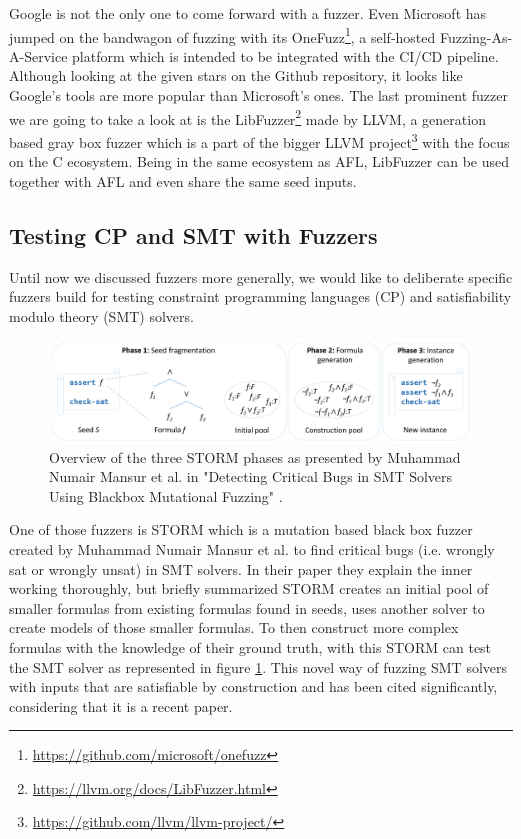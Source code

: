 Google is not the only one to come forward with a fuzzer. Even Microsoft has jumped on the bandwagon of fuzzing with its OneFuzz\footnote{\url{https://github.com/microsoft/onefuzz}}, a self-hosted Fuzzing-As-A-Service platform which is intended to be integrated with the CI/CD pipeline. Although looking at the given stars on the Github repository, it looks like Google's tools are more popular than Microsoft's ones. The last prominent fuzzer we are going to take a look at is the LibFuzzer\footnote{\url{https://llvm.org/docs/LibFuzzer.html}} made by LLVM, a generation based gray box fuzzer which is a part of the bigger LLVM project\footnote{\url{https://github.com/llvm/llvm-project/}} with the focus on the C ecosystem. Being in the same ecosystem as AFL, LibFuzzer can be used together with AFL and even share the same seed inputs.

\subsection{Testing CP and SMT with Fuzzers}
Until now we discussed fuzzers more generally, we would like to deliberate specific fuzzers build for testing constraint programming languages (CP) and satisfiability modulo theory (SMT) solvers.


\begin{figure}
	\centering
	\includegraphics[width=1.0\textwidth]{images/STORM}
	\caption{Overview of the three STORM phases as presented by Muhammad Numair Mansur et al. in "Detecting Critical Bugs in SMT Solvers Using Blackbox Mutational Fuzzing" \cite{1mansur2020detecting}.}
	\label{fig:STORM}
\end{figure}
One of those fuzzers is STORM which is a mutation based black box fuzzer created by Muhammad Numair Mansur et al. \cite{1mansur2020detecting} to find critical bugs (i.e. wrongly sat or wrongly unsat) in SMT solvers. In their paper \cite{1mansur2020detecting} they explain the inner working thoroughly, but briefly summarized STORM creates an initial pool of smaller formulas from existing formulas found in seeds, uses another solver to create models of those smaller formulas. To then construct more complex formulas with the knowledge of their ground truth, with this STORM can test the SMT solver as represented in figure \ref{fig:STORM}. This novel way of fuzzing SMT solvers with inputs that are satisfiable by construction and has been cited significantly, considering that it is a recent paper.


